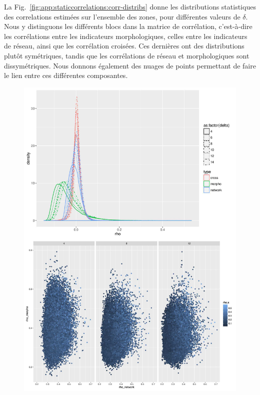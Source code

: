 

La Fig.~\ref{fig:app:staticcorrelations:corr-distribs} donne les distributions statistiques des correlations estimées sur l'ensemble des zones, pour différentes valeurs de $\delta$. Nous y distinguons les différents blocs dans la matrice de corrélation, c'est-à-dire les corrélations entre les indicateurs morphologiques, celles entre les indicateurs de réseau, ainsi que les corrélation croisées. Ces dernières ont des distributions plutôt symétriques, tandis que les corrélations de réseau et morphologiques sont dissymétriques. Nous donnons également des nuages de points permettant de faire le lien entre ces différentes composantes.


\begin{figure}
\includegraphics[width=\linewidth,height=0.9\textheight]{Figures/Final/A-staticcorrelations-corr-distribs.jpg}

\end{figure}
